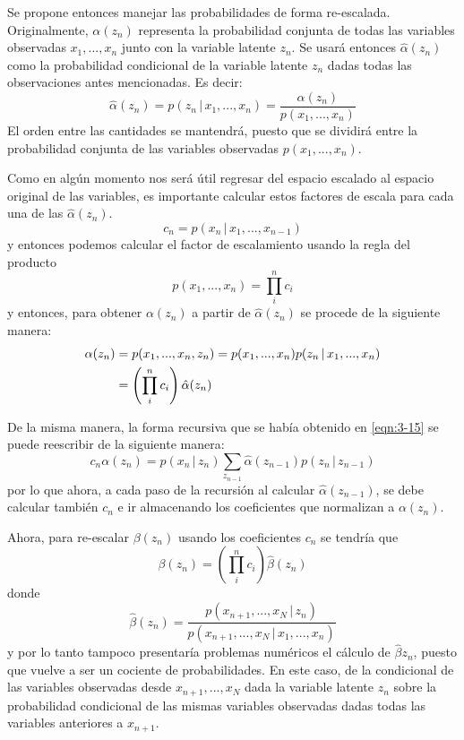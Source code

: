 Se propone entonces manejar las probabilidades de forma re-escalada. Originalmente, $\alpha(z_n)$ representa la probabilidad conjunta de todas las variables observadas $x_1, ..., x_n$ junto con la variable latente $z_n$. Se usará entonces $\hat \alpha(z_n)$ como la probabilidad condicional de la variable latente $z_n$ dadas todas las observaciones antes mencionadas. Es decir:
\begin{equation}
  \hat \alpha(z_n) = p(z_n \,|\, x_1, ..., x_n )
    = \frac{\alpha(z_n)}{p(x_1, ..., x_n)}
  \label{eqn:3-21}
\end{equation}
El orden entre las cantidades se mantendrá, puesto que se dividirá entre la probabilidad conjunta de las variables observadas $p(x_1, ..., x_n)$.

Como en algún momento nos será útil regresar del espacio escalado al espacio original de las variables, es importante calcular estos factores de escala para cada una de las $\hat \alpha(z_n)$.
\begin{equation}
  c_n = p(x_n \,|\, x_1, ..., x_{n-1})
  \label{eqn:3-22}
\end{equation}
y entonces podemos calcular el factor de escalamiento usando la regla del producto
\begin{equation}
  p(x_1, ..., x_n) = \prod_i^n c_i 
  \label{eqn:3-23}
\end{equation}
y entonces, para obtener $\alpha(z_n)$ a partir de $\hat \alpha(z_n)$ se procede de la siguiente manera:
\begin{align}
  \alpha(z_n) &= p(x_1, ..., x_n, z_n) 
    = p(x_1, ..., x_n) p(z_n \,|\, x_1, ..., x_n ) \notag \\
    &= \left( \prod_i^n c_i \right) \hat \alpha(z_n)    
  \label{eqn:3-24}
\end{align}

De la misma manera, la forma recursiva que se había obtenido en \eqref{eqn:3-15} se puede reescribir de la siguiente manera:
\begin{equation}
  c_n \alpha(z_n) = p(x_n \,|\, z_n) \sum_{z_{n-1}} 
    \hat \alpha(z_{n-1}) p(z_n \,|\, z_{n-1})
    \label{eqn:3-25}
\end{equation}
por lo que ahora, a cada paso de la recursión al calcular $\hat \alpha(z_{n-1})$, se debe calcular también $c_n$ e ir almacenando los coeficientes que normalizan a $\alpha(z_n)$.

Ahora, para re-escalar $\beta(z_n)$ usando los coeficientes $c_n$ se tendría que
\begin{equation}
  \beta(z_n) = \left( \prod_i^n c_i \right) \hat \beta(z_n)
  \label{eqn:3-26}
\end{equation}
donde 
\begin{equation}
  \hat \beta(z_n) = 
    \frac{p(x_{n+1}, ..., x_N \,|\, z_n)}
    {p(x_{n+1}, ..., x_N \,|\, x_1, ..., x_n)}
  \label{eqn:3-27}
\end{equation}
y por lo tanto tampoco presentaría problemas numéricos el cálculo de $\hat \beta{z_n}$, puesto que vuelve a ser un cociente de probabilidades. En este caso, de la condicional de las variables observadas desde $x_{n+1}, ..., x_N$ dada la variable latente $z_n$ sobre la probabilidad condicional de las mismas variables observadas dadas todas las variables anteriores a $x_{n+1}$.


